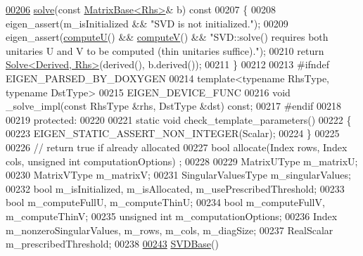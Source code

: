 \begin{DoxyCode}
\hyperlink{group___s_v_d___module_ab28499936c0764fe5b56b9f4de701e26}{00206}   \hyperlink{group___s_v_d___module_ab28499936c0764fe5b56b9f4de701e26}{solve}(\textcolor{keyword}{const} \hyperlink{group___core___module_class_eigen_1_1_matrix_base}{MatrixBase<Rhs>}& b)\textcolor{keyword}{ const}
00207 \textcolor{keyword}{  }\{
00208     eigen\_assert(m\_isInitialized && \textcolor{stringliteral}{"SVD is not initialized."});
00209     eigen\_assert(\hyperlink{group___s_v_d___module_a705a7c2709e1624ccc19aa748a78d473}{computeU}() && \hyperlink{group___s_v_d___module_a5f12efcb791eb007d4a4890ac5255ac4}{computeV}() && \textcolor{stringliteral}{"SVD::solve() requires both unitaries U and V
       to be computed (thin unitaries suffice)."});
00210     \textcolor{keywordflow}{return} \hyperlink{group___core___module_class_eigen_1_1_solve}{Solve<Derived, Rhs>}(derived(), b.derived());
00211   \}
00212   
00213 \textcolor{preprocessor}{  #ifndef EIGEN\_PARSED\_BY\_DOXYGEN}
00214   \textcolor{keyword}{template}<\textcolor{keyword}{typename} RhsType, \textcolor{keyword}{typename} DstType>
00215   EIGEN\_DEVICE\_FUNC
00216   \textcolor{keywordtype}{void} \_solve\_impl(\textcolor{keyword}{const} RhsType &rhs, DstType &dst) \textcolor{keyword}{const};
00217 \textcolor{preprocessor}{  #endif}
00218 
00219 \textcolor{keyword}{protected}:
00220   
00221   \textcolor{keyword}{static} \textcolor{keywordtype}{void} check\_template\_parameters()
00222   \{
00223     EIGEN\_STATIC\_ASSERT\_NON\_INTEGER(Scalar);
00224   \}
00225   
00226   \textcolor{comment}{// return true if already allocated}
00227   \textcolor{keywordtype}{bool} allocate(Index rows, Index cols, \textcolor{keywordtype}{unsigned} \textcolor{keywordtype}{int} computationOptions) ;
00228 
00229   MatrixUType m\_matrixU;
00230   MatrixVType m\_matrixV;
00231   SingularValuesType m\_singularValues;
00232   \textcolor{keywordtype}{bool} m\_isInitialized, m\_isAllocated, m\_usePrescribedThreshold;
00233   \textcolor{keywordtype}{bool} m\_computeFullU, m\_computeThinU;
00234   \textcolor{keywordtype}{bool} m\_computeFullV, m\_computeThinV;
00235   \textcolor{keywordtype}{unsigned} \textcolor{keywordtype}{int} m\_computationOptions;
00236   Index m\_nonzeroSingularValues, m\_rows, m\_cols, m\_diagSize;
00237   RealScalar m\_prescribedThreshold;
00238 
\hyperlink{group___s_v_d___module_abed06fc6f4b743e1f76a7b317539da87}{00243}   \hyperlink{group___s_v_d___module_abed06fc6f4b743e1f76a7b317539da87}{SVDBase}()

\end{DoxyCode}
